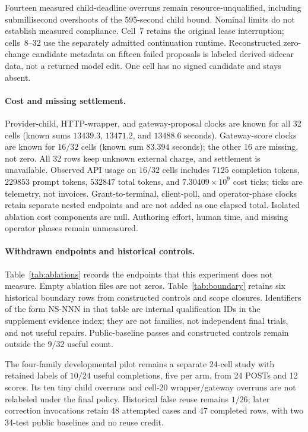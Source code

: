 \documentclass{article}
\begin{document}
Fourteen measured child-deadline overruns remain resource-unqualified,
including submillisecond overshoots of the 595-second child bound. Nominal
limits do not establish measured compliance. Cell~7 retains the original
lease interruption; cells~8--32 use the separately admitted continuation
runtime. Reconstructed zero-change candidate metadata on fifteen failed
proposals is labeled derived sidecar data, not a returned model edit.
One cell has no signed candidate and stays absent.

\paragraph{Cost and missing settlement.}
Provider-child, HTTP-wrapper, and gateway-proposal clocks are known for all
32 cells (known sums $13439.3$, $13471.2$, and $13488.6$ seconds). Gateway-score
clocks are known for $16/32$ cells (known sum $83.394$ seconds); the other 16
are missing, not zero. All 32 rows keep unknown external charge, and
settlement is unavailable. Observed API usage on $16/32$ cells includes
$7125$ completion tokens, $229853$ prompt tokens, $532847$ total tokens, and
$7.30409\times 10^{9}$ cost ticks; ticks are telemetry, not invoices.
Grant-to-terminal, client-poll, and operator-phase clocks retain separate
nested endpoints and are not added as one elapsed total. Isolated ablation
cost components are null. Authoring effort, human time, and missing operator
phases remain unmeasured.

\paragraph{Withdrawn endpoints and historical controls.}
Table~\ref{tab:ablations} records the endpoints that this experiment does not
measure. Empty ablation files are not zeros. Table~\ref{tab:boundary} retains
six historical boundary rows from constructed controls and scope closures.
Identifiers of the form NS-NNN in that table are internal qualification IDs
in the supplement evidence index; they are not families, not independent
final trials, and not useful repairs. Public-baseline passes and constructed
controls remain outside the $9/32$ useful count.

The four-family developmental pilot remains a separate 24-cell study with
retained labels of $10/24$ useful completions, five per arm, from 24 POSTs
and 12 scores. Its ten tiny child overruns and cell-20 wrapper/gateway
overruns are not relabeled under the final policy. Historical false reuse
remains $1/26$; later correction invocations retain 48 attempted cases and
47 completed rows, with two 34-test public baselines and no reuse credit.
\end{document}
